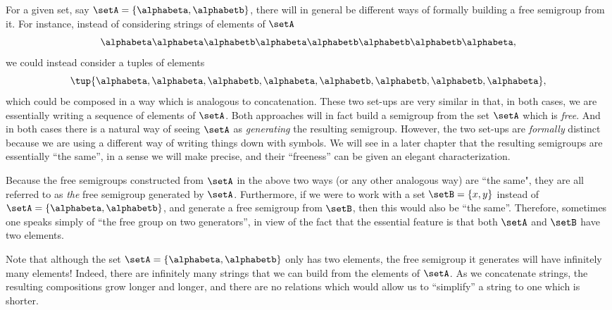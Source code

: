 For a given set, say $\setA = \{ \alphabeta, \alphabetb\}$, there will in general be different ways of formally building a free semigroup from it. For instance, instead of considering strings of elements of $\setA$ 
\begin{equation}  
    \alphabeta\alphabeta \alphabetb \alphabeta \alphabetb \alphabetb \alphabetb \alphabeta,
  \end{equation}
 we could instead consider a tuples of elements 
\begin{equation}  
   \tup{ \alphabeta, \alphabeta,  \alphabetb,  \alphabeta,  \alphabetb,  \alphabetb,  \alphabetb,  \alphabeta},
  \end{equation}
which could be composed in a way which is analogous to concatenation. These two set-ups are very similar in that, in both cases, we are essentially writing a sequence of elements of $\setA$. Both approaches will in fact build a semigroup from the set $\setA$ which is \emph{free}. And in both cases there is a natural way of seeing $\setA$ as \emph{generating} the resulting semigroup. However, the two set-ups are \emph{formally} distinct because we are using a different way of writing things down with symbols. We will see in a later chapter that the resulting semigroups are essentially ``the same'', in a sense we will make precise, and their ``freeness'' can be given an elegant characterization. 

Because the free semigroups constructed from $\setA$ in the above two ways (or any other analogous way) are ``the same", they are all referred to as \emph{the} free semigroup generated by $\setA$. Furthermore, if we were to work with a set $\setB = \{ x, y \}$ instead of $\setA = \{ \alphabeta, \alphabetb\}$, and generate a free semigroup from $\setB$, then this would also be ``the same''. Therefore, sometimes one speaks simply of ``the free group on two generators'', in view of the fact that the essential feature is that both $\setA$ and $\setB$ have two elements. 

Note that although the set $\setA = \{ \alphabeta, \alphabetb\}$ only has two elements, the free semigroup it generates will have infinitely many elements! Indeed, there are infinitely many strings that we can build from the elements of $\setA$. As we concatenate strings, the resulting compositions grow longer and longer, and there are no relations which would allow us to ``simplify'' a string to one which is shorter. 
 


